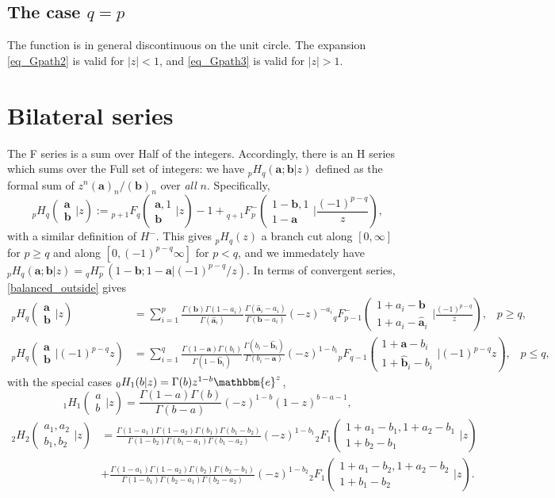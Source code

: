 \documentclass[12pt]{article}
\newcommand{\ee}[0] {\mathbbm{e}}
\numberwithin{equation}{section}
\newcommand{\Head}[3] {{}_{#1}{#2}_{#3}}
\newcommand{\Arg}[3] {\left( \begin{array}{c} #1 \\ #2 \end{array} \Big| {#3}  \right)}
\newcommand{\FF}[6] {{}_{#1}{#2}_{#3} \left( \begin{array}{c} #4 \\ #5 \end{array} \Big| {#6}  \right)}
\newcommand{\FFe}[7] {{}_{#1}^{\,}{#2}_{#3}^{#4} \left( \begin{array}{c} #5 \\ #6 \end{array} \Big| {#7} \right)}
\newcommand{\bfa}[0] {\mathbf{a}}
\newcommand{\bfb}[0] {\mathbf{b}}
\begin{document}
\subsection{The case $q=p$}
The function is in general discontinuous on the unit circle. The expansion \eqref{eq_Gpath2} is valid for $|z| < 1$, and \eqref{eq_Gpath3} is valid for $|z| > 1$.



\section{Bilateral series}
The F series is a sum over Half of the integers. Accordingly, there is an H series which sums over the Full set of integers: we have ${}_p H_q(\bfa; \bfb|z)$ defined as the formal sum of $z^n (\bfa)_n/(\bfb)_n$ over \emph{all} $n$. Specifically,
\begin{equation*}
\FF{p}{H}{q}{\bfa}{\bfb}{z} := \FF{p+1}{F}{q}{\bfa,1}{\bfb}{z}-1 + \FFe{q+1}{F}{p}{-}{1-\bfb,1}{1-\bfa}{\frac{(-1)^{p-q}}{z}} \text{,}
\end{equation*}
with a similar definition of $H^{-}$. This gives ${}_p H_q(z)$ a branch cut along $[0,\infty]$ for $p\ge q$ and along $[0,(-1)^{p-q} \infty]$ for $p < q$, and we immedately have ${}_p H_q (\bfa; \bfb | z) = {}_q H_p^{-} (1-\bfb; 1-\bfa | (-1)^{p-q}/z)$. In terms of convergent series, \eqref{balanced_outside} gives
\begin{align*}
\FF{p}{H}{q}{\bfa}{\bfb}{z} &= \sum_{i=1}^p \frac{\Gamma(\bfb)\Gamma(1-a_i)}{\Gamma(\hat{\bfa}_i)}\frac{\Gamma(\hat{\bfa}_i-a_i)}{\Gamma(\bfb-a_i)} (-z)^{-a_i} \FFe{q}{F}{p-1}{-}{1+a_i-\bfb}{1+a_i-\hat{\bfa}_i}{\frac{(-1)^{p-q}}{z}}\text{,} \quad p \ge q \text{,}\\
\FF{p}{H}{q}{\bfa}{\bfb}{(-1)^{p-q}z} &= \sum_{i=1}^q \frac{\Gamma(1-\bfa)\Gamma(b_i)}{\Gamma(1-\hat{\bfb}_i)}\frac{\Gamma(b_i-\hat{\bfb}_i)}{\Gamma(b_i-\bfa)} (-z)^{1-b_i} \FF{p}{F}{q-1}{1+\bfa-b_i}{1+\hat{\bfb}_i-b_i}{(-1)^{p-q}z}\text{,} \quad p \le q \text{,}
\end{align*}
with the special cases ${}_0 H_1(b|z) = \Gamma(b) z^{1-b} \ee^{z}$,
 \begin{equation}
\label{equ_1H1}
\Head{1}{H}{1} \Arg{a}{b}{z} = \frac{\Gamma(1-a)\Gamma(b)}{\Gamma(b-a)} (-z)^{1-b}(1-z)^{b-a-1}\text{,}
\end{equation}
\begin{equation}
\label{equ_2H2}
\begin{aligned}
\FF{2}{H}{2}{a_1,a_2}{b_1,b_2}{z} &= \frac{\Gamma(1-a_1)\Gamma(1-a_2)\Gamma(b_1)\Gamma(b_1-b_2)}{\Gamma(1-b_2)\Gamma(b_1-a_1)\Gamma(b_1-a_2)} (-z)^{1-b_1} \FF{2}{F}{1}{1+a_1-b_1,1+a_2-b_1}{1+b_2-b_1}{z}\\
&+ \frac{\Gamma(1-a_1)\Gamma(1-a_2)\Gamma(b_2)\Gamma(b_2-b_1)}{\Gamma(1-b_1)\Gamma(b_2-a_1)\Gamma(b_2-a_2)} (-z)^{1-b_2} \FF{2}{F}{1}{1+a_1-b_2,1+a_2-b_2}{1+b_1-b_2}{z}\text{.}
\end{aligned}
\end{equation}
\end{document}
